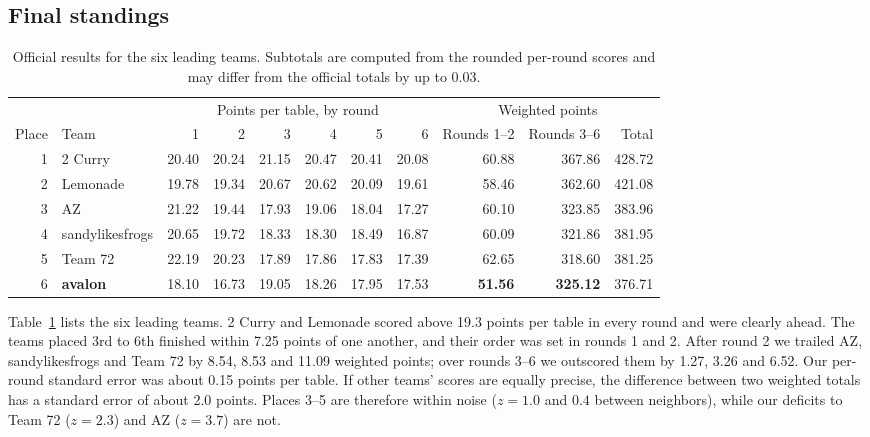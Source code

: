 \documentclass[10pt]{article}
\begin{document}
\subsection{Final standings}

\begin{table}[!htb]
\centering\small
\begin{tabular}{rl rrrrrr rrr}
\toprule
& & \multicolumn{6}{c}{Points per table, by round} & \multicolumn{3}{c}{Weighted points}\\
\cmidrule(lr){3-8}\cmidrule(lr){9-11}
Place & Team & 1 & 2 & 3 & 4 & 5 & 6 & Rounds 1--2 & Rounds 3--6 & Total\\
\midrule
1 & 2 Curry & 20.40 & 20.24 & 21.15 & 20.47 & 20.41 & 20.08 & 60.88 & 367.86 & 428.72\\
2 & Lemonade & 19.78 & 19.34 & 20.67 & 20.62 & 20.09 & 19.61 & 58.46 & 362.60 & 421.08\\
3 & AZ & 21.22 & 19.44 & 17.93 & 19.06 & 18.04 & 17.27 & 60.10 & 323.85 & 383.96\\
4 & sandylikesfrogs & 20.65 & 19.72 & 18.33 & 18.30 & 18.49 & 16.87 & 60.09 & 321.86 & 381.95\\
5 & Team 72 & 22.19 & 20.23 & 17.89 & 17.86 & 17.83 & 17.39 & 62.65 & 318.60 & 381.25\\
6 & \textbf{avalon} & 18.10 & 16.73 & 19.05 & 18.26 & 17.95 & 17.53 & \textbf{51.56} & \textbf{325.12} & 376.71\\
\bottomrule
\end{tabular}
\caption{Official results for the six leading teams. Subtotals are computed from the rounded per-round scores and may differ from the official totals by up to 0.03.}\label{tab:standings}
\end{table}

Table~\ref{tab:standings} lists the six leading teams. 2 Curry and Lemonade scored above 19.3 points per table in every round and were clearly ahead. The teams placed 3rd to 6th finished within 7.25 points of one another, and their order was set in rounds 1 and 2. After round 2 we trailed AZ, sandylikesfrogs and Team 72 by 8.54, 8.53 and 11.09 weighted points; over rounds 3--6 we outscored them by 1.27, 3.26 and 6.52. Our per-round standard error was about 0.15 points per table. If other teams' scores are equally precise, the difference between two weighted totals has a standard error of about 2.0 points. Places 3--5 are therefore within noise ($z=1.0$ and $0.4$ between neighbors), while our deficits to Team 72 ($z=2.3$) and AZ ($z=3.7$) are not.
\end{document}

